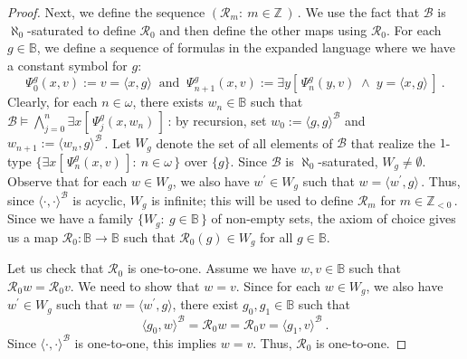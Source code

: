 \documentclass[10pt,a4paper, openany,  oldfontcommands]{memoir}
\newtheorem{open problem} [theorem] {Open Problem}
\newtheorem{open question} [theorem] {Open Question}
\begin{document}
\begin{proof}
Next,  we define the sequence   $  \left(  \mathcal{R}_m :    \   m  \in \mathbb{Z}  \,  \right)    \,  $.
We use the fact that  $  \mathcal{B}  $  is $  \aleph_0$-saturated to define  $  \mathcal{R}_0 $  
and then define the other maps  using    $  \mathcal{R}_0 $. 
For each $g  \in   \mathbb{B}  $,  we define a sequence   of formulas  in the expanded language where we have a constant symbol for $g$: 
 \[
   \Psi_0^g  (x ,  v  )   :=    v  =    \langle   x ,  g   \rangle   
   \      \mbox{  and   }      \   
   \Psi_{  n+1  }^g  (x ,  v  )   :=     \exists y   \left[   \,    \Psi_n^g  ( y ,  v )   \;  \wedge   \;     y   =    \langle   x  ,  g   \rangle     \,   \right]   
   \         .
\]
Clearly, for each  $n \in  \omega  $,   there exists  $ w_n   \in   \mathbb{B}   $    such that  
$  \mathcal{B}   \models \bigwedge_{ j =  0 }^{ n }    \exists  x  \left[  \,  \Psi_j^g  ( x,  w_n )  \,   \right]   \,   $: 
by recursion,  set  $  w_0 :=  \langle  g,  g  \rangle^{  \mathcal{B}  }  $  and  
$  w_{ n+1}  :=  \langle  w_n ,  g  \rangle^{  \mathcal{B}  }         \,   $.
Let     $  W_g $  denote the set of all elements of  $  \mathcal{B}  $  that realize  the $1$-type 
 $  \lbrace    \exists  x   \left[  \,   \Psi_n^g  (x, v )   \,   \right]      :   \   n \in  \omega   \,   \rbrace  $    over  $  \lbrace  g  \rbrace  $. 
Since     $  \mathcal{B}  $   is  $  \aleph_0 $-saturated,   $  W_g  \neq   \emptyset    $. 
 Observe that  for each   $  w  \in  W_g $,   we  also  have  $  w^{  \prime }  \in  W_g  $  such that  $  w  =  \langle  w^{  \prime } ,  g  \rangle   \,   $. 
 Thus, since  $  \langle  \cdot  ,  \cdot  \rangle^{  \mathcal{B} }  $  is acyclic,   $  W_g  $  is infinite; 
 this will be used to define  $  \mathcal{R}_m  $  for $  m \in  \mathbb{Z}_{ < 0  }     \,   $.
 Since we have a family $  \lbrace   W_g  :   \   g  \in  \mathbb{B}   \,  \rbrace  $  of non-empty sets, 
 the axiom of choice gives us  a map   $  \mathcal{R}_0     :        \mathbb{B}   \to   \mathbb{B}   $  
such that   $  \mathcal{R}_0  \left(    g  \right)      \in  W_g  $  for all $  g  \in    \mathbb{B}   $.  






Let us check that     $  \mathcal{R}_0  $  is one-to-one. 
Assume we have  $  w, v  \in  \mathbb{B}  $  such that   $    \mathcal{R}_0    w  =  \mathcal{R}_0  v  $. 
We need to show that  $  w  = v  $. 
Since   for each   $  w  \in  W_g $,   we  also  have  $  w^{  \prime }   \in  W_g  $  such that  $  w  =  \langle  w^{  \prime } ,  g  \rangle     $, 
  there exist  $  g_0,  g_1  \in  \mathbb{B}  $  such that  
\[
\langle  g_0  ,  w  \rangle^{  \mathcal{B}  }   
=    \mathcal{R}_0    w  =  \mathcal{R}_0  v   =  
\langle  g_1  ,  v  \rangle^{  \mathcal{B}  }        
 \      .
\]
Since  $  \langle  \cdot   ,  \cdot     \rangle^{  \mathcal{B}  }  $  is one-to-one, 
this implies  $    w  =  v  $. 
Thus,   $     \mathcal{R}_0   $ is one-to-one. 







\end{proof}
\end{document}
